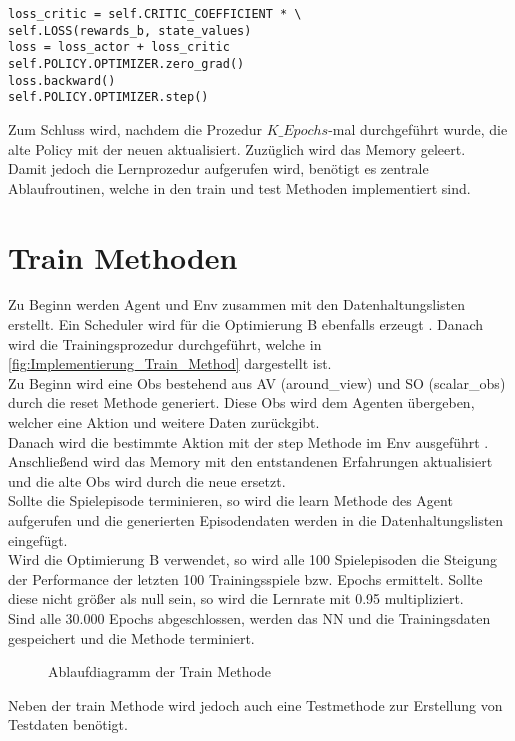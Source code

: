 \begin{lstlisting}[caption=Bestimmung des PPO-Losses und Update der Netze, label=code:Bestimmung_PPO_Losses_update_NN, style=Python]
loss_critic = self.CRITIC_COEFFICIENT * \ 
self.LOSS(rewards_b, state_values)
loss = loss_actor + loss_critic 
self.POLICY.OPTIMIZER.zero_grad()
loss.backward()
self.POLICY.OPTIMIZER.step()
\end{lstlisting}
Zum Schluss wird, nachdem die Prozedur $K\_Epochs$-mal durchgeführt wurde, die alte Policy mit der neuen aktualisiert. Zuzüglich wird das Memory geleert.\\
Damit jedoch die Lernprozedur aufgerufen wird, benötigt es zentrale Ablaufroutinen, welche in den train und test Methoden implementiert sind.

\section{Train Methoden} \label{sec:Implementierung_train_Methode}
Zu Beginn werden Agent und Env zusammen mit den Datenhaltungslisten  erstellt. Ein Scheduler wird für die Optimierung B ebenfalls erzeugt . Danach wird die Trainingsprozedur durchgeführt, welche in \autoref{fig:Implementierung_Train_Method} dargestellt ist.\\
Zu Beginn wird eine Obs bestehend aus AV (around\_view) und SO (scalar\_obs) durch die reset Methode \fullref{subsec:Konzept_Schnittstelle} generiert. 
Diese Obs wird dem Agenten übergeben, welcher eine Aktion und weitere Daten zurückgibt.\\
Danach wird die bestimmte Aktion mit der step Methode im Env ausgeführt .
Anschließend wird das Memory mit den entstandenen Erfahrungen aktualisiert und die alte Obs wird durch die neue ersetzt.\\
Sollte die Spielepisode terminieren, so wird die learn Methode des Agent aufgerufen und die generierten Episodendaten werden in die Datenhaltungslisten eingefügt.\\
Wird die Optimierung B verwendet, so wird alle 100 Spielepisoden die Steigung der Performance der letzten 100 Trainingsspiele bzw. Epochs ermittelt. Sollte diese nicht größer als null sein, so wird die Lernrate mit 0.95 multipliziert.\\
Sind alle 30.000 Epochs abgeschlossen, werden das NN und die Trainingsdaten gespeichert und die Methode terminiert.\\
\begin{figure}[H]
	\centering
	
	\caption[Ablaufdiagramm der train Methode]{Ablaufdiagramm der Train Methode}
	\label{fig:Implementierung_Train_Method}
\end{figure}
Neben der train Methode wird jedoch auch eine Testmethode zur Erstellung von Testdaten benötigt.


